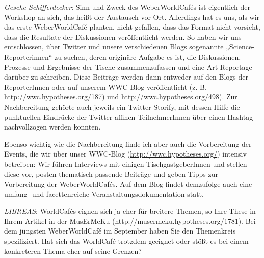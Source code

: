 \documentclass[a4paper,
fontsize=11pt,
oneside,
numbers=noperiodatend,
parskip=half-,
bibliography=totoc,
final
]{scrartcl}
\begin{document}
\emph{Gesche Schifferdecker}: Sinn und Zweck des WeberWorldCafés ist
eigentlich der Workshop an sich, das heißt der Austausch vor Ort.
Allerdings hat es uns, als wir das erste WeberWorldCafé planten, nicht
gefallen, dass das Format nicht vorsieht, dass die Resultate der
Diskussionen veröffentlicht werden. So haben wir uns entschlossen, über
Twitter und unsere verschiedenen Blogs sogenannte
„Science-Reporterinnen`` zu suchen, deren originäre Aufgabe es ist, die
Diskussionen, Prozesse und Ergebnisse der Tische zusammenzufassen und
eine Art Reportage darüber zu schreiben. Diese Beiträge werden dann
entweder auf den Blogs der ReporterInnen oder auf unserem WWC-Blog
veröffentlicht (z. B. \url{http://wwc.hypotheses.org/187}) und
\url{http://wwc.hypotheses.org/498}). Zur Nachbereitung gehörte auch
jeweils ein Twitter-Storify, mit dessen Hilfe die punktuellen Eindrücke
der Twitter-affinen TeilnehmerInnen über einen Hashtag nachvollzogen
werden konnten.

Ebenso wichtig wie die Nachbereitung finde ich aber auch die
Vorbereitung der Events, die wir über unser WWC-Blog
(\url{http://wwc.hypotheses.org/}) intensiv betreiben: Wir führen
Interviews mit einigen TischgastgeberInnen und stellen diese vor, posten
thematisch passende Beiträge und geben Tipps zur Vorbereitung der
WeberWorldCafés. Auf dem Blog findet demzufolge auch eine umfang- und
facettenreiche Veranstaltungsdokumentation statt.

\emph{LIBREAS}: WorldCafés eignen sich ja eher für breitere Themen, so
Ihre These in Ihrem Artikel in der MusErMeKu
(http://musermeku.hypotheses.org/1781). Bei dem jüngsten WeberWorldCafé
im September haben Sie den Themenkreis spezifiziert. Hat sich das
WorldCafé trotzdem geeignet oder stößt es bei einem konkreteren Thema
eher auf seine Grenzen?
\end{document}
